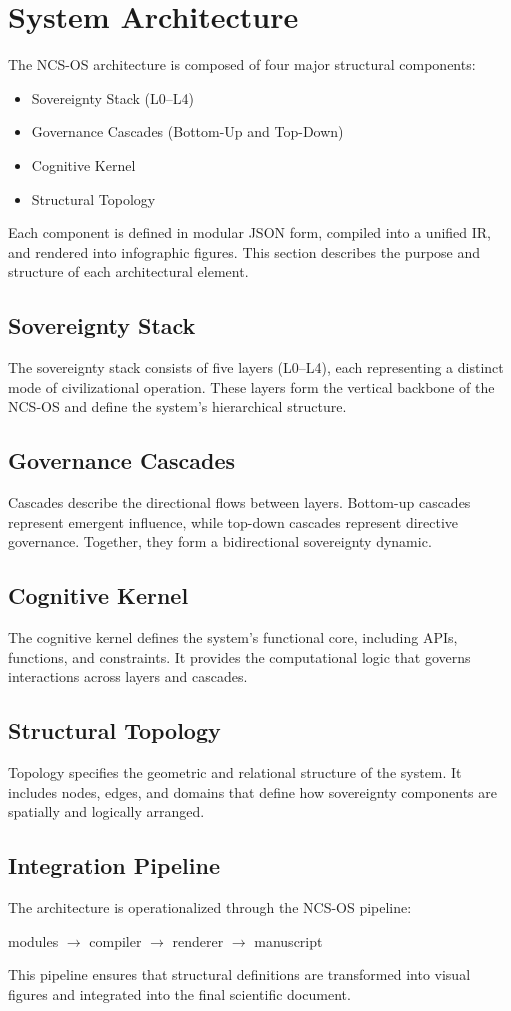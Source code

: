 \section{System Architecture}

The NCS-OS architecture is composed of four major structural components:
\begin{itemize}
    \item Sovereignty Stack (L0--L4)
    \item Governance Cascades (Bottom-Up and Top-Down)
    \item Cognitive Kernel
    \item Structural Topology
\end{itemize}

Each component is defined in modular JSON form, compiled into a unified IR, and rendered into infographic figures. This section describes the purpose and structure of each architectural element.

\subsection{Sovereignty Stack}
The sovereignty stack consists of five layers (L0--L4), each representing a distinct mode of civilizational operation. These layers form the vertical backbone of the NCS-OS and define the system's hierarchical structure.

\subsection{Governance Cascades}
Cascades describe the directional flows between layers. Bottom-up cascades represent emergent influence, while top-down cascades represent directive governance. Together, they form a bidirectional sovereignty dynamic.

\subsection{Cognitive Kernel}
The cognitive kernel defines the system's functional core, including APIs, functions, and constraints. It provides the computational logic that governs interactions across layers and cascades.

\subsection{Structural Topology}
Topology specifies the geometric and relational structure of the system. It includes nodes, edges, and domains that define how sovereignty components are spatially and logically arranged.

\subsection{Integration Pipeline}
The architecture is operationalized through the NCS-OS pipeline:
\begin{center}
modules $\rightarrow$ compiler $\rightarrow$ renderer $\rightarrow$ manuscript
\end{center}

This pipeline ensures that structural definitions are transformed into visual figures and integrated into the final scientific document.
